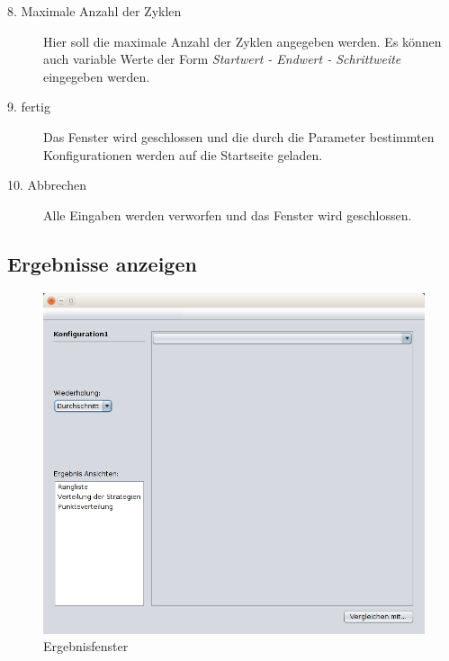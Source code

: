 \begin{description}
\item[8. Maximale Anzahl der Zyklen] Hier soll die maximale Anzahl der Zyklen angegeben werden. Es können auch variable Werte der Form \textit{Startwert - Endwert - Schrittweite} eingegeben werden.

\item[9. fertig] Das Fenster wird geschlossen und die durch die Parameter bestimmten Konfigurationen werden auf die Startseite geladen.

\item[10. Abbrechen] Alle Eingaben werden verworfen und das Fenster wird geschlossen.


\end{description}

\pagebreak


\subsection{Ergebnisse anzeigen}

\begin{figure}[!hp] 
  \centering
     \includegraphics[width=1.1\textwidth]{GUI_Entwurf/Ergebnisfenster(1).png}
  \caption{Ergebnisfenster}
  \label{fig:Bild7}
\end{figure}

